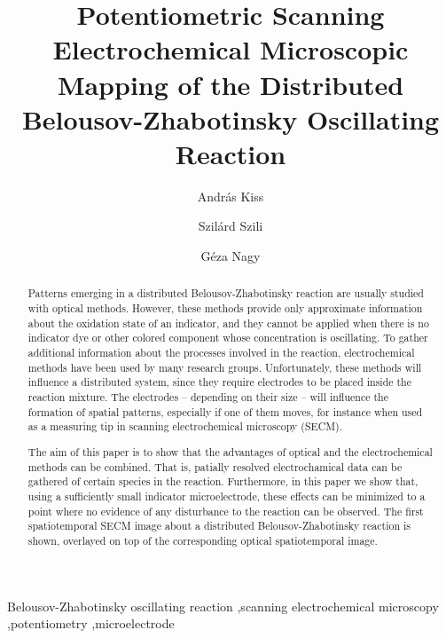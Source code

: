 \documentclass[3p, twocolumn]{elsarticle}
\begin{document}
\begin{frontmatter}

\title{Potentiometric Scanning Electrochemical Microscopic Mapping of the Distributed Belousov-Zhabotinsky Oscillating Reaction}
\author[akiss]{András Kiss}
\author[szszilard]{Szilárd Szili}
\address[akiss, gnagy, szszilard]{Department of General and Physical Chemistry, Faculty of Sciences, University of Pécs, 7624 Pécs, Ifjúság útja 6, Hungary}
\address[akiss, gnagy]{János Szentágothai Research Centre, University of Pécs, 7624 Pécs, Ifjúság Útja 20, Hungary}
\author[gnagy]{Géza Nagy}


\begin{abstract}

Patterns emerging in a distributed Belousov-Zhabotinsky reaction are usually studied with optical methods.
However, these methods provide only approximate information about the oxidation state of an indicator, and they cannot be applied when there is no indicator dye or other colored component whose concentration is oscillating.
To gather additional information about the processes involved in the reaction, electrochemical methods have been used by many research groups.
Unfortunately, these methods will influence a distributed system, since they require electrodes to be placed inside the reaction mixture.
The electrodes -- depending on their size -- will influence the formation of spatial patterns, especially if one of them moves, for instance when used as a measuring tip in scanning electrochemical microscopy (SECM).

The aim of this paper is to show that the advantages of optical and the electrochemical methods can be combined.
That is, patially resolved electrochamical data can be gathered of certain species in the reaction.
Furthermore, in this paper we show that, using a sufficiently small indicator microelectrode, these effects can be minimized to a point where no evidence of any disturbance to the reaction can be observed.
The first spatiotemporal SECM image about a distributed Belousov-Zhabotinsky reaction is shown, overlayed on top of the corresponding optical spatiotemporal image.

\end{abstract}
\begin{keyword}
	Belousov-Zhabotinsky oscillating reaction \sep scanning electrochemical microscopy \sep potentiometry \sep microelectrode
\end{keyword}
\end{frontmatter}
\end{document}
